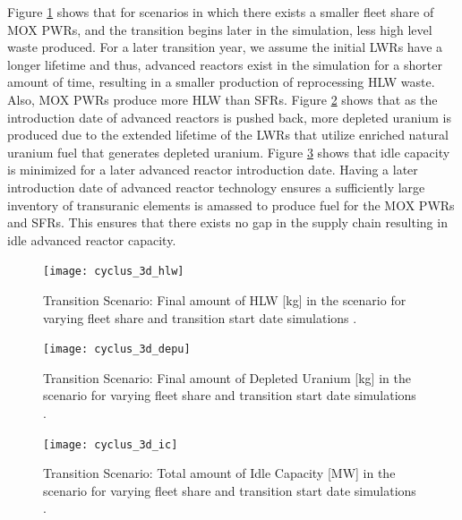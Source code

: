 Figure \ref{fig:cyclus_3d_hlw} shows that for scenarios in which 
there exists a smaller fleet share of \gls{MOX} \glspl{PWR}, and the 
transition begins later in the simulation, less high 
level waste produced. 
For a later transition year, we assume the initial 
\glspl{LWR} have a longer lifetime
and thus, advanced reactors exist in the simulation for a shorter 
amount of time, resulting in a smaller production of reprocessing 
HLW waste. 
Also, \gls{MOX} \glspl{PWR} produce more \gls{HLW} than \glspl{SFR}. 
Figure \ref{fig:cyclus_3d_depu} shows that as the introduction date 
of advanced reactors is pushed back, more depleted uranium is produced 
due to the extended lifetime of the \glspl{LWR} that utilize enriched 
natural uranium fuel that generates depleted uranium. 
Figure \ref{fig:cyclus_3d_ic} shows that idle capacity is minimized 
for a later advanced reactor introduction date. 
Having a later introduction date of advanced reactor technology ensures 
a sufficiently large inventory of transuranic elements is amassed
to produce fuel for the \gls{MOX} \glspl{PWR} and \glspl{SFR}.  
This ensures that there exists no gap in the supply chain resulting 
in idle advanced reactor capacity.

\begin{figure}[]
    \centering
    \texttt{[image: cyclus\_3d\_hlw]} 
    \caption{\Cyclus Transition Scenario: Final amount of HLW [kg] in the scenario for varying fleet share and transition start date simulations \cite{chee_arfc/dcwrapper_2019}.}
    \label{fig:cyclus_3d_hlw}
\end{figure}

\begin{figure}[]
    \centering
    \texttt{[image: cyclus\_3d\_depu]} 
    \caption{\Cyclus Transition Scenario: Final amount of Depleted Uranium [kg] in the scenario for varying fleet share and transition start date simulations \cite{chee_arfc/dcwrapper_2019}.}
    \label{fig:cyclus_3d_depu}
\end{figure}

\begin{figure}[]
    \centering
    \texttt{[image: cyclus\_3d\_ic]} 
    \caption{\Cyclus Transition Scenario: Total amount of Idle Capacity [MW] in the scenario for varying fleet share and transition start date simulations \cite{chee_arfc/dcwrapper_2019}.}
    \label{fig:cyclus_3d_ic}
\end{figure}


